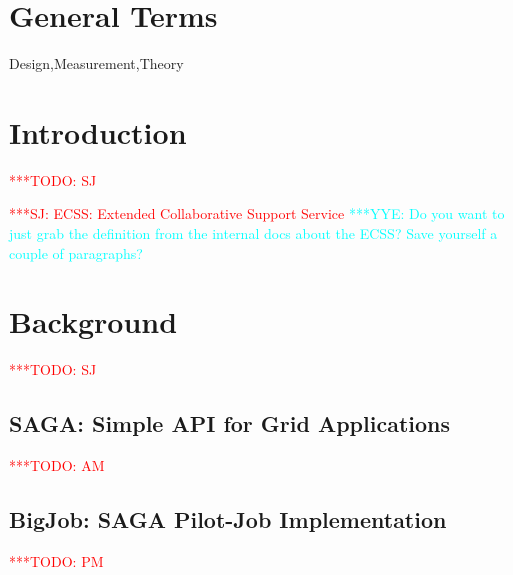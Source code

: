 \documentclass{sig-alternate}
\begin{document}
\newif\ifdraft 
\drafttrue 
\ifdraft
\newcommand{\mrnote}[1]{{\textcolor{green} { ***MR: #1 }}}
\newcommand{\jhanote}[1]{ {\textcolor{red} { ***SJ: #1 }}}
\newcommand{\yyenote}[1]{ {\textcolor{cyan} { ***YYE: #1 }}}
\newcommand{\pmnote}[1]{ {\textcolor{blue} { ***PM: #1 }}}
\newcommand{\todo}[1]{ {\textcolor{red} { ***TODO: #1 }}}
\newcommand{\fix}[1]{ {\textcolor{red} { ***FIX: #1 }}}
\newcommand{\reviewer}[1]{} 
\else \newcommand{\yyenote}[1]{}
\newcommand{\mrmnote}[1]{} \newcommand{\pmnote}[1]{}
\newcommand{\jhanote}[1]{} \newcommand{\todo}[1]{ {\textcolor{red} {
      ***TODO: #1 }}} \newcommand{\fix}[1]{} \fi




\section*{General Terms}{Design,Measurement,Theory}

 \keywords{}

\section{Introduction} \todo{SJ}

\jhanote{ECSS: Extended Collaborative Support Service }
\yyenote{Do you want to just grab the definition from the internal docs
about the ECSS? Save yourself a couple of paragraphs?}

\section{Background} \todo{SJ}

\subsection{SAGA: Simple API for Grid Applications}
\todo{AM}

\subsection{BigJob: SAGA Pilot-Job Implementation}
\todo{PM}

\end{document}

